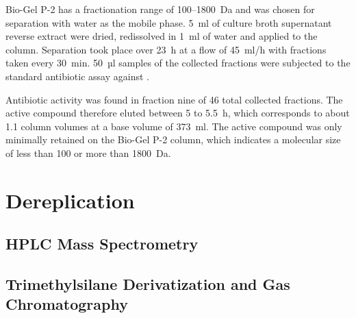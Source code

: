 Bio-Gel P-2 has a fractionation range of 100--1800~Da and was chosen for separation with water as the mobile phase.
5~ml of culture broth supernatant reverse extract were dried, redissolved in 1~ml of water and applied to the column.
Separation took place over 23~h at a flow of 45~ml/h with fractions taken every 30~min.
50~µl samples of the collected fractions were subjected to the standard antibiotic assay against \coli{}.

Antibiotic activity was found in fraction nine of 46 total collected fractions.
The active compound therefore eluted between 5 to 5.5~h, which corresponds to about 1.1 column volumes at a base volume of 373~ml.
The active compound was only minimally retained on the Bio-Gel P-2 column, which indicates a molecular size of less than 100 or more than 1800~Da.



\section{Dereplication} %
\label{sec:dereplication}

\subsection{HPLC Mass Spectrometry} %
\label{sub:hplc_mass_spectrometry}


\subsection{Trimethylsilane Derivatization and Gas Chromatography} %
\label{sub:trimethylsilane_derivatization_and_gas_chromatography_results}

